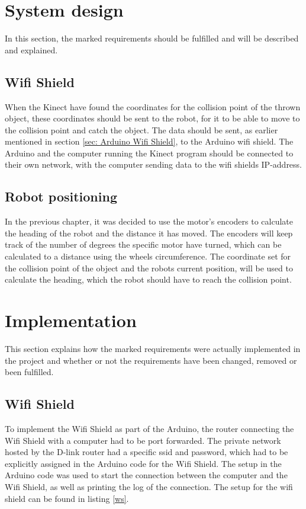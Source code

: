 \section{System design}
\label{sec:i2System design} 
In this section, the marked requirements should be fulfilled and will be described and explained.  

\subsection{Wifi Shield}
\label{sec:Wifi Shield SD}
When the Kinect have found the coordinates for the collision point of the thrown object, these coordinates should be sent to the robot, for it to be able to move to the collision point and catch the object. 
The data should be sent, as earlier mentioned in section \ref{sec: Arduino Wifi Shield}, to the Arduino wifi shield. The Arduino and the computer running the Kinect program should be connected to their own network, with the computer sending data to the wifi shields IP-address.

\subsection{Robot positioning}
\label{sec:Robot positioning System Design}
In the previous chapter, it was decided to use the motor's encoders to calculate the heading of the robot and the distance it has moved. The encoders will keep track of the number of degrees the specific motor have turned, which can be calculated to a distance using the wheels circumference.
The coordinate set for the collision point of the object and the robots current position, will be used to calculate the heading, which the robot should have to reach the collision point. 

\section{Implementation}
\label{sec:i2Implementation}
This section explains how the marked requirements were actually implemented in the project and whether or not the requirements have been changed, removed or been fulfilled. 

\subsection{Wifi Shield}
\label{sec:Wifi Shield Implementation}
To implement the Wifi Shield as part of the Arduino, the router connecting the Wifi Shield with a computer had to be port forwarded. The private network hosted by the D-link router had a specific ssid and password, which had to be explicitly assigned in the Arduino code for the Wifi Shield. The setup in the Arduino code was used to start the connection between the computer and the Wifi Shield, as well as printing the log of the connection. The setup for the wifi shield can be found in listing \ref{ws}.

